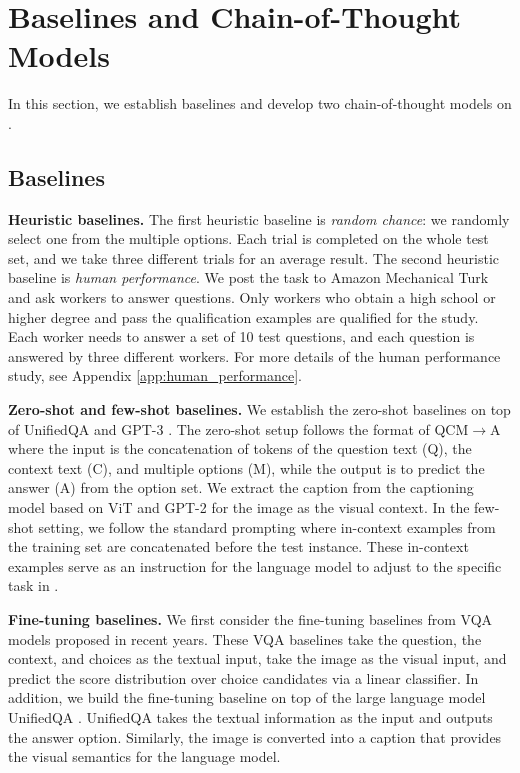\section{Baselines and Chain-of-Thought Models}
\label{sec:method}
In this section, we establish baselines and develop two chain-of-thought models on \name{}.

\subsection{Baselines}
\textbf{Heuristic baselines.} The first heuristic baseline is \textit{random chance}: we randomly select one from the multiple options. Each trial is completed on the whole test set, and we take three different trials for an average result. The second heuristic baseline is \textit{human performance}. We post the task to Amazon Mechanical Turk and ask workers to answer \name{} questions. Only workers who obtain a high school or higher degree and pass the qualification examples are qualified for the study. Each worker needs to answer a set of 10 test questions, and each question is answered by three different workers. For more details of the human performance study, see Appendix \ref{app:human_performance}.

\textbf{Zero-shot and few-shot baselines.} We establish the zero-shot baselines on top of UnifiedQA \cite{khashabi2020unifiedqa} and GPT-3 \cite{chen2020big}. The zero-shot setup follows the format of  QCM$\rightarrow$A where the input is the concatenation of tokens of the question text (Q), the context text (C), and multiple options (M), while the output is to predict the answer (A) from the option set. We extract the caption from the captioning model based on ViT \cite{dosovitskiy2020image} and GPT-2 \cite{radford2019language} for the image as the visual context. In the few-shot setting, we follow the standard prompting \cite {brown2020language} where in-context examples from the training set are concatenated before the test instance. These in-context examples serve as an instruction for the language model to adjust to the specific task in \name{}. 

\textbf{Fine-tuning baselines.} We first consider the fine-tuning baselines from VQA models \cite{Anderson2017up,Kim2018,yu2019mcan,gao2019dynamic,pmlr-v139-kim21k,lu2021iconqa,li2019visualbert} proposed in recent years. These VQA baselines take the question, the context, and choices as the textual input, take the image as the visual input, and predict the score distribution over choice candidates via a linear classifier. In addition, we build the fine-tuning baseline on top of the large language model UnifiedQA \cite{khashabi2020unifiedqa}. UnifiedQA takes the textual information as the input and outputs the answer option. Similarly, the image is converted into a caption that provides the visual semantics for the language model.


